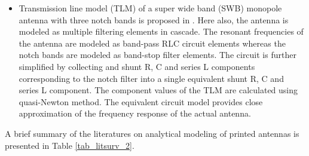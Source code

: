 \begin{itemize}
\item Transmission line model (TLM) of a super wide band (SWB) monopole antenna with three notch bands is proposed in \cite{optEqCkt_ads}. Here also, the antenna is modeled as multiple filtering elements in cascade. The resonant frequencies of the antenna are modeled as band-pass RLC circuit elements whereas the notch bands are modeled as band-stop filter elements. The circuit is further simplified by collecting and shunt R, C and series L components corresponding to the notch filter into a single equivalent shunt R, C and series L component. The component values of the TLM are calculated using quasi-Newton method. The equivalent circuit model provides close approximation of the frequency response of the actual antenna.
\end{itemize}

A brief summary of the literatures on analytical modeling of printed antennas is presented in Table \ref{tab_litsurv_2}.

